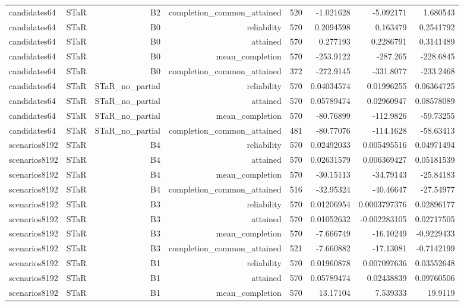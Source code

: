 \begin{longtable}{llrrrrrr}
candidates64 & STaR & B2 & completion\_common\_attained & 520 & -1.021628 & -5.092171 & 1.680543 \\
candidates64 & STaR & B0 & reliability & 570 & 0.2094598 & 0.163479 & 0.2541792 \\
candidates64 & STaR & B0 & attained & 570 & 0.277193 & 0.2286791 & 0.3141489 \\
candidates64 & STaR & B0 & mean\_completion & 570 & -253.9122 & -287.265 & -228.6845 \\
candidates64 & STaR & B0 & completion\_common\_attained & 372 & -272.9145 & -331.8077 & -233.2468 \\
candidates64 & STaR & STaR\_no\_partial & reliability & 570 & 0.04034574 & 0.01996255 & 0.06364725 \\
candidates64 & STaR & STaR\_no\_partial & attained & 570 & 0.05789474 & 0.02960947 & 0.08578089 \\
candidates64 & STaR & STaR\_no\_partial & mean\_completion & 570 & -80.76899 & -112.9826 & -59.73255 \\
candidates64 & STaR & STaR\_no\_partial & completion\_common\_attained & 481 & -80.77076 & -114.1628 & -58.63413 \\
scenarios8192 & STaR & B4 & reliability & 570 & 0.02492033 & 0.005495516 & 0.04971494 \\
scenarios8192 & STaR & B4 & attained & 570 & 0.02631579 & 0.006369427 & 0.05181539 \\
scenarios8192 & STaR & B4 & mean\_completion & 570 & -30.15113 & -34.79143 & -25.84183 \\
scenarios8192 & STaR & B4 & completion\_common\_attained & 516 & -32.95324 & -40.46647 & -27.54977 \\
scenarios8192 & STaR & B3 & reliability & 570 & 0.01206954 & 0.0003797376 & 0.02896177 \\
scenarios8192 & STaR & B3 & attained & 570 & 0.01052632 & -0.002283105 & 0.02717505 \\
scenarios8192 & STaR & B3 & mean\_completion & 570 & -7.666749 & -16.10249 & -0.9229433 \\
scenarios8192 & STaR & B3 & completion\_common\_attained & 521 & -7.660882 & -17.13081 & -0.7142199 \\
scenarios8192 & STaR & B1 & reliability & 570 & 0.01960878 & 0.007097636 & 0.03552648 \\
scenarios8192 & STaR & B1 & attained & 570 & 0.05789474 & 0.02438839 & 0.09760506 \\
scenarios8192 & STaR & B1 & mean\_completion & 570 & 13.17104 & 7.539333 & 19.9119 \\

\end{longtable}
